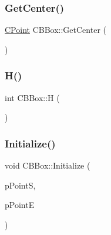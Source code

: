\mbox{\label{classCBBox_a08398476b46cfe26e2c825df2acc29ad}} 
\subsubsection{\texorpdfstring{GetCenter()}{GetCenter()}}
{\footnotesize\ttfamily \mbox{\hyperlink{classCPoint}{C\+Point}} C\+B\+Box\+::\+Get\+Center (\begin{DoxyParamCaption}{ }\end{DoxyParamCaption})}

\mbox{\label{classCBBox_a4224d61560438a2febb4e7e7323e2b08}} 
\subsubsection{\texorpdfstring{H()}{H()}}
{\footnotesize\ttfamily int C\+B\+Box\+::H (\begin{DoxyParamCaption}{ }\end{DoxyParamCaption})\hspace{0.3cm}{\ttfamily [inline]}}

\mbox{\label{classCBBox_a60eff894d9a143099e91277312a8eb4d}} 
\subsubsection{\texorpdfstring{Initialize()}{Initialize()}\hspace{0.1cm}{\footnotesize\ttfamily [1/2]}}
{\footnotesize\ttfamily void C\+B\+Box\+::\+Initialize (\begin{DoxyParamCaption}\item[{\mbox{\hyperlink{classCPoint}{C\+Point}} $\ast$}]{p\+PointS,  }\item[{\mbox{\hyperlink{classCPoint}{C\+Point}} $\ast$}]{p\+PointE }\end{DoxyParamCaption})}

\mbox{\label{classCBBox_a14455cfc9abfa1c70b1140d03e8afff2}} 
